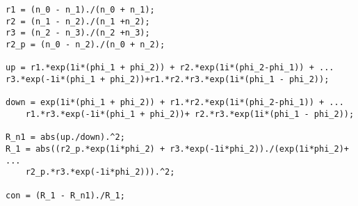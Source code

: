 \begin{singlespace}
\begin{lstlisting}
r1 = (n_0 - n_1)./(n_0 + n_1);
r2 = (n_1 - n_2)./(n_1 +n_2);
r3 = (n_2 - n_3)./(n_2 +n_3);
r2_p = (n_0 - n_2)./(n_0 + n_2);

up = r1.*exp(1i*(phi_1 + phi_2)) + r2.*exp(1i*(phi_2-phi_1)) + ...
r3.*exp(-1i*(phi_1 + phi_2))+r1.*r2.*r3.*exp(1i*(phi_1 - phi_2));

down = exp(1i*(phi_1 + phi_2)) + r1.*r2.*exp(1i*(phi_2-phi_1)) + ...
    r1.*r3.*exp(-1i*(phi_1 + phi_2))+ r2.*r3.*exp(1i*(phi_1 - phi_2));

R_n1 = abs(up./down).^2;
R_1 = abs((r2_p.*exp(1i*phi_2) + r3.*exp(-1i*phi_2))./(exp(1i*phi_2)+ ...
    r2_p.*r3.*exp(-1i*phi_2))).^2;

con = (R_1 - R_n1)./R_1;

\end{lstlisting}

\end{singlespace} 